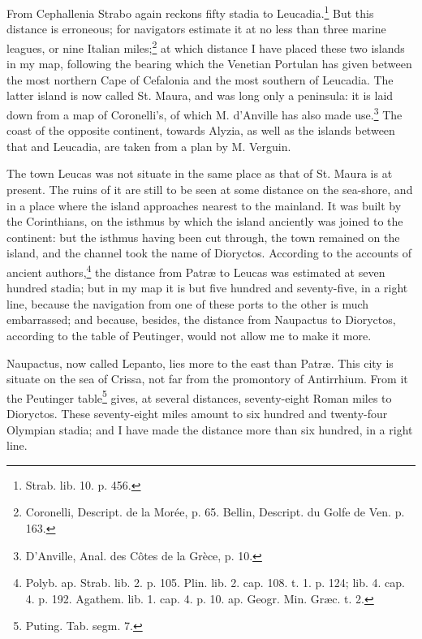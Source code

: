 \documentclass[a4paper, 11pt, oneside, polutonikogreek, english]{article}
\begin{document}
From Cephallenia Strabo again reckons fifty stadia to Leucadia.\footnote{Strab. lib. 10. p. 456.} But this distance is erroneous; for navigators estimate it at no less than three marine leagues, or nine Italian miles;\footnote{Coronelli, Descript. de la Morée, p. 65. Bellin, Descript. du Golfe de Ven. p. 163.} at which distance I have placed these two islands in my map, following the bearing which the Venetian Portulan has given between the most northern Cape of Cefalonia and the most southern of Leucadia. The latter island is now called St. Maura, and was long only a peninsula: it is laid down from a map of Coronelli's, of which M. d'Anville has also made use.\footnote{D'Anville, Anal. des Côtes de la Grèce, p. 10.} The coast of the opposite continent, towards Alyzia, as well as the islands between that and Leucadia, are taken from a plan by M. Verguin.

The town Leucas was not situate in the same place as that of St. Maura is at present. The ruins of it are still to be seen at some distance on the sea-shore, and in a place where the island approaches nearest to the mainland. It was built by the Corinthians, on the isthmus by which the island anciently was joined to the continent: but the isthmus having been cut through, the town remained on the island, and the channel took the name of Dioryctos. According to the accounts of ancient authors,\footnote{Polyb. ap. Strab. lib. 2. p. 105. Plin. lib. 2. cap. 108. t. 1. p. 124; lib. 4. cap. 4. p. 192. Agathem. lib. 1. cap. 4. p. 10. ap. Geogr. Min. Græc. t. 2.} the distance from Patræ to Leucas was estimated at seven hundred stadia; but in my map it is but five hundred and seventy-five, in a right line, because the navigation from one of these ports to the other is much embarrassed; and because, besides, the distance from Naupactus to Dioryctos, according to the table of Peutinger, would not allow me to make it more.

Naupactus, now called Lepanto, lies more to the east than Patræ. This city is situate on the sea of Crissa, not far from the promontory of Antirrhium. From it the Peutinger table\footnote{Puting. Tab. segm. 7.} gives, at several distances, seventy-eight Roman miles to Dioryctos. These seventy-eight miles amount to six hundred and twenty-four Olympian stadia; and I have made the distance more than six hundred, in a right line.
\end{document}
